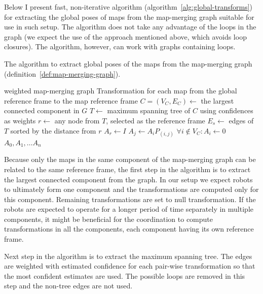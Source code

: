 Below I present fast, non-iterative algorithm (algorithm~\ref{alg:global-transforms}) for extracting the global poses of maps from the map-merging graph suitable for use in such setup. The algorithm does not take any advantage of the loops in the graph (we expect the use of the approach mentioned above, which avoids loop closures). The algorithm, however, can work with graphs containing loops.

\begin{algorithm}
    \caption[Global poses extraction]{The algorithm to extract global poses of the maps from the map-merging graph (definition~\ref{def:map-merging-graph}).}
    \label{alg:global-transforms}
    \begin{algorithmic}[1]
        \Require weighted map-merging graph
        \Ensure Transformation for each map from the global reference frame to the map reference frame
            \State $C = (V_C, E_C) \gets$ the largest connected component in $G$
            \State $T \gets$ maximum spanning tree of $C$ using confidences as weights
            \State $r \gets$ any node from $T$, selected as the reference frame
            \State $E_s \gets$ edges of $T$ sorted by the distance from $r$
            \State $A_r \gets I$
                \State $A_j \gets A_i P_{(i,j)}$
            \EndFor
            \State $\forall i \not\in V_C: A_i \gets 0$
            \State \Return $A_0, A_1, \dots A_n$
        \EndFunction
    \end{algorithmic}
\end{algorithm}

Because only the maps in the same component of the map-merging graph can be related to the same reference frame, the first step in the algorithm is to extract the largest connected component from the graph. In our setup we expect robots to ultimately form one component and the transformations are computed only for this component. Remaining transformations are set to null transformation. If the robots are expected to operate for a longer period of time separately in multiple components, it might be beneficial for the coordination to compute transformations in all the components, each component having its own reference frame.

Next step in the algorithm is to extract the maximum spanning tree. The edges are weighted with estimated confidence for each pair-wise transformation so that the most confident estimates are used. The possible loops are removed in this step and the non-tree edges are not used.

